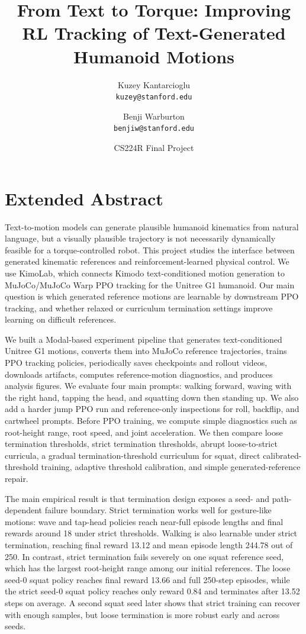 \documentclass[10pt]{article}
\title{\vspace{-1.0cm}From Text to Torque: Improving RL Tracking of Text-Generated Humanoid Motions}
\author{
Kuzey Kantarcioglu \\
\texttt{kuzey@stanford.edu}
\and
Benji Warburton \\
\texttt{benjiw@stanford.edu}
}
\date{CS224R Final Project}
\begin{document}
\maketitle

\section*{Extended Abstract}

Text-to-motion models can generate plausible humanoid kinematics from natural language, but a visually plausible trajectory is not necessarily dynamically feasible for a torque-controlled robot. This project studies the interface between generated kinematic references and reinforcement-learned physical control. We use KimoLab, which connects Kimodo text-conditioned motion generation to MuJoCo/MuJoCo Warp PPO tracking for the Unitree G1 humanoid. Our main question is which generated reference motions are learnable by downstream PPO tracking, and whether relaxed or curriculum termination settings improve learning on difficult references.

We built a Modal-based experiment pipeline that generates text-conditioned Unitree G1 motions, converts them into MuJoCo reference trajectories, trains PPO tracking policies, periodically saves checkpoints and rollout videos, downloads artifacts, computes reference-motion diagnostics, and produces analysis figures. We evaluate four main prompts: walking forward, waving with the right hand, tapping the head, and squatting down then standing up. We also add a harder jump PPO run and reference-only inspections for roll, backflip, and cartwheel prompts. Before PPO training, we compute simple diagnostics such as root-height range, root speed, and joint acceleration. We then compare loose termination thresholds, strict termination thresholds, abrupt loose-to-strict curricula, a gradual termination-threshold curriculum for squat, direct calibrated-threshold training, adaptive threshold calibration, and simple generated-reference repair.

The main empirical result is that termination design exposes a seed- and path-dependent failure boundary. Strict termination works well for gesture-like motions: wave and tap-head policies reach near-full episode lengths and final rewards around 18 under strict thresholds. Walking is also learnable under strict termination, reaching final reward 13.12 and mean episode length 244.78 out of 250. In contrast, strict termination fails severely on one squat reference seed, which has the largest root-height range among our initial references. The loose seed-0 squat policy reaches final reward 13.66 and full 250-step episodes, while the strict seed-0 squat policy reaches only reward 0.84 and terminates after 13.52 steps on average. A second squat seed later shows that strict training can recover with enough samples, but loose termination is more robust early and across seeds.
\end{document}
